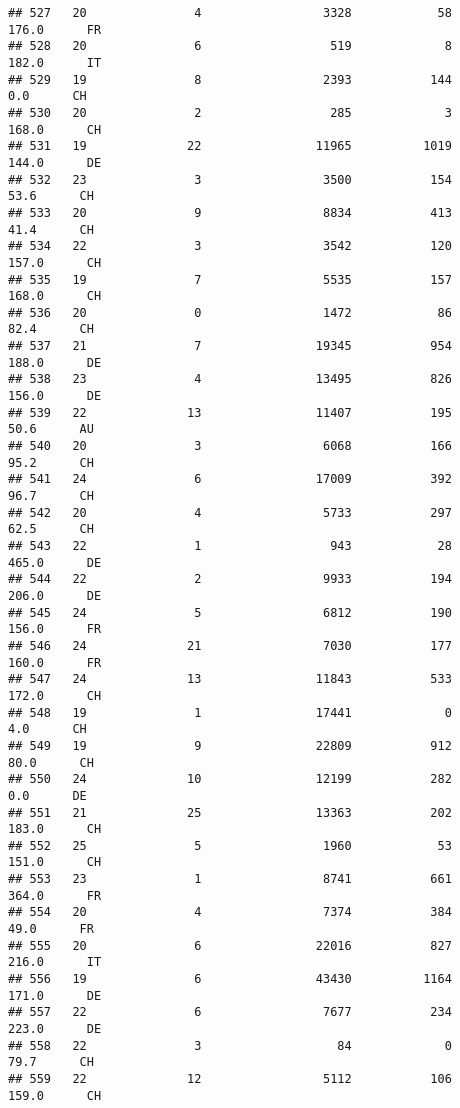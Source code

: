\documentclass[
]{article}
\begin{document}
\begin{verbatim}
## 527   20               4                 3328            58    176.0      FR
## 528   20               6                  519             8    182.0      IT
## 529   19               8                 2393           144      0.0      CH
## 530   20               2                  285             3    168.0      CH
## 531   19              22                11965          1019    144.0      DE
## 532   23               3                 3500           154     53.6      CH
## 533   20               9                 8834           413     41.4      CH
## 534   22               3                 3542           120    157.0      CH
## 535   19               7                 5535           157    168.0      CH
## 536   20               0                 1472            86     82.4      CH
## 537   21               7                19345           954    188.0      DE
## 538   23               4                13495           826    156.0      DE
## 539   22              13                11407           195     50.6      AU
## 540   20               3                 6068           166     95.2      CH
## 541   24               6                17009           392     96.7      CH
## 542   20               4                 5733           297     62.5      CH
## 543   22               1                  943            28    465.0      DE
## 544   22               2                 9933           194    206.0      DE
## 545   24               5                 6812           190    156.0      FR
## 546   24              21                 7030           177    160.0      FR
## 547   24              13                11843           533    172.0      CH
## 548   19               1                17441             0      4.0      CH
## 549   19               9                22809           912     80.0      CH
## 550   24              10                12199           282      0.0      DE
## 551   21              25                13363           202    183.0      CH
## 552   25               5                 1960            53    151.0      CH
## 553   23               1                 8741           661    364.0      FR
## 554   20               4                 7374           384     49.0      FR
## 555   20               6                22016           827    216.0      IT
## 556   19               6                43430          1164    171.0      DE
## 557   22               6                 7677           234    223.0      DE
## 558   22               3                   84             0     79.7      CH
## 559   22              12                 5112           106    159.0      CH

\end{verbatim}
\end{document}
